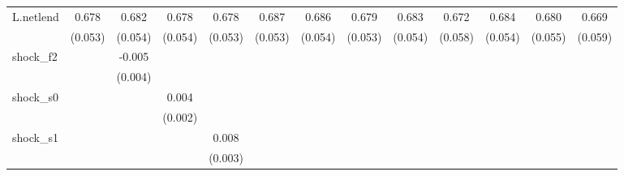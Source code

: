 {\begin{tabular}{l*{12}{c}}
\addlinespace
L.netlend   &       0.678\sym{***}&       0.682\sym{***}&       0.678\sym{***}&       0.678\sym{***}&       0.687\sym{***}&       0.686\sym{***}&       0.679\sym{***}&       0.683\sym{***}&       0.672\sym{***}&       0.684\sym{***}&       0.680\sym{***}&       0.669\sym{***}\\
            &     (0.053)         &     (0.054)         &     (0.054)         &     (0.053)         &     (0.053)         &     (0.054)         &     (0.053)         &     (0.054)         &     (0.058)         &     (0.054)         &     (0.055)         &     (0.059)         \\
\addlinespace
shock\_f2    &                     &      -0.005         &                     &                     &                     &                     &                     &                     &                     &                     &                     &                     \\
            &                     &     (0.004)         &                     &                     &                     &                     &                     &                     &                     &                     &                     &                     \\
\addlinespace
shock\_s0    &                     &                     &       0.004\sym{*}  &                     &                     &                     &                     &                     &                     &                     &                     &                     \\
            &                     &                     &     (0.002)         &                     &                     &                     &                     &                     &                     &                     &                     &                     \\
\addlinespace
shock\_s1    &                     &                     &                     &       0.008\sym{**} &                     &                     &                     &                     &                     &                     &                     &                     \\
            &                     &                     &                     &     (0.003)         &                     &                     &                     &                     &                     &                     &                     &                     \\

\end{tabular}}
